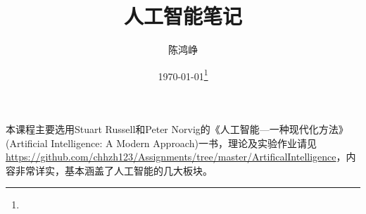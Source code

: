 \documentclass{note}
\title{人工智能笔记}
\author{陈鸿峥}
\date{{\builddatemonth\today}\protect\footnote{\text{Build \builddate\today}}} %
\renewcommand{\thefootnote}{\fnsymbol{footnote}}
\begin{document}
\maketitle
\renewcommand{\thefootnote}{\arabic{footnote}}
\setcounter{footnote}{0}

\setcounter{tocdepth}{2}%
\tableofcontents

\bigskip\bigskip

本课程主要选用Stuart Russell和Peter Norvig的《人工智能---一种现代化方法》(Artificial Intelligence: A Modern Approach)一书，理论及实验作业请见\url{https://github.com/chhzh123/Assignments/tree/master/ArtificalIntelligence}，内容非常详实，基本涵盖了人工智能的几大板块。










\end{document}
